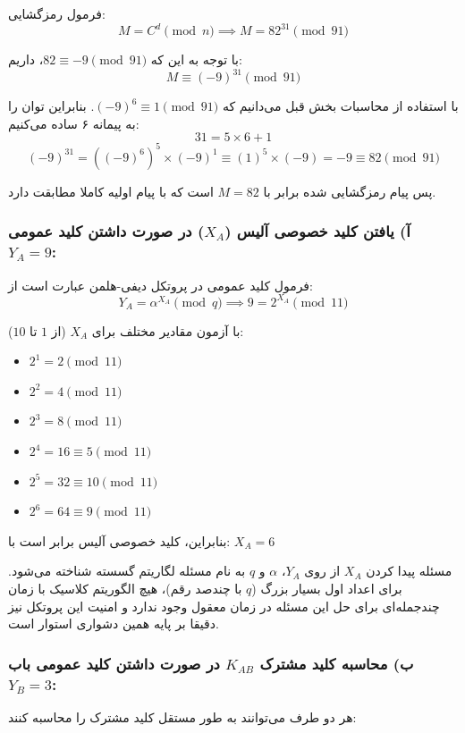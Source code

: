 فرمول رمزگشایی:
$$M = C^d \pmod{n} \implies M = 82^{31} \pmod{91}$$

با توجه به این که $82 \equiv -9 \pmod{91}$، داریم:
$$M \equiv (-9)^{31} \pmod{91}$$

با استفاده از محاسبات بخش قبل می‌دانیم که $(-9)^6 \equiv 1 \pmod{91}$. بنابراین توان را به پیمانه ۶ ساده می‌کنیم:
$$31 = 5 \times 6 + 1$$
$$(-9)^{31} = ((-9)^6)^5 \times (-9)^1 \equiv (1)^5 \times (-9) = -9 \equiv 82 \pmod{91}$$

پس پیام رمزگشایی شده برابر با \textbf{$M = 82$} است که با پیام اولیه کاملا مطابقت دارد.


\subsubsection*{آ) یافتن کلید خصوصی آلیس ($X_A$) در صورت داشتن کلید عمومی $Y_A = 9$:}

فرمول کلید عمومی در پروتکل دیفی-هلمن عبارت است از:
$$Y_A = \alpha^{X_A} \pmod{q} \implies 9 = 2^{X_A} \pmod{11}$$

با آزمون مقادیر مختلف برای $X_A$ (از $1$ تا $10$):
\begin{itemize}
    \item $2^1 = 2 \pmod{11}$
    \item $2^2 = 4 \pmod{11}$
    \item $2^3 = 8 \pmod{11}$
    \item $2^4 = 16 \equiv 5 \pmod{11}$
    \item $2^5 = 32 \equiv 10 \pmod{11}$
    \item $2^6 = 64 \equiv 9 \pmod{11}$
\end{itemize}

بنابراین، کلید خصوصی آلیس برابر است با: \textbf{$X_A = 6$}

مسئله پیدا کردن $X_A$ از روی $Y_A$، $\alpha$ و $q$ به نام {مسئله لگاریتم گسسته} شناخته می‌شود. برای اعداد اول بسیار بزرگ ($q$ با چندصد رقم)، هیچ الگوریتم کلاسیک با زمان چندجمله‌ای برای حل این مسئله در زمان معقول وجود ندارد و امنیت این پروتکل نیز دقیقا بر پایه همین دشواری استوار است.

\subsubsection*{ب) محاسبه کلید مشترک $K_{AB}$ در صورت داشتن کلید عمومی باب $Y_B = 3$:}

هر دو طرف می‌توانند به طور مستقل کلید مشترک را محاسبه کنند:

